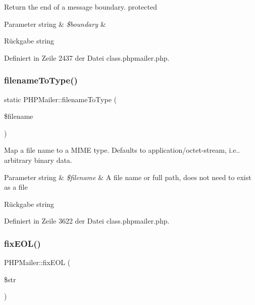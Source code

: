 Return the end of a message boundary.  protected 
\begin{DoxyParams}[1]{Parameter}
string & {\em \$boundary} & \\
\hline
\end{DoxyParams}
\begin{DoxyReturn}{Rückgabe}
string 
\end{DoxyReturn}


Definiert in Zeile 2437 der Datei class.\+phpmailer.\+php.

\mbox{\label{class_p_h_p_mailer_add54abd3420cd88712530270ca0c641d}} 
\subsubsection{\texorpdfstring{filename\+To\+Type()}{filenameToType()}}
{\footnotesize\ttfamily static P\+H\+P\+Mailer\+::filename\+To\+Type (\begin{DoxyParamCaption}\item[{}]{\$filename }\end{DoxyParamCaption})\hspace{0.3cm}{\ttfamily [static]}}

Map a file name to a M\+I\+ME type. Defaults to \textquotesingle{}application/octet-\/stream\textquotesingle{}, i.\+e.. arbitrary binary data. 
\begin{DoxyParams}[1]{Parameter}
string & {\em \$filename} & A file name or full path, does not need to exist as a file \\
\hline
\end{DoxyParams}
\begin{DoxyReturn}{Rückgabe}
string 
\end{DoxyReturn}


Definiert in Zeile 3622 der Datei class.\+phpmailer.\+php.

\mbox{\label{class_p_h_p_mailer_a3b4fad02d1b8ed3aaefbff42bf0b2846}} 
\subsubsection{\texorpdfstring{fix\+E\+O\+L()}{fixEOL()}}
{\footnotesize\ttfamily P\+H\+P\+Mailer\+::fix\+E\+OL (\begin{DoxyParamCaption}\item[{}]{\$str }\end{DoxyParamCaption})}

